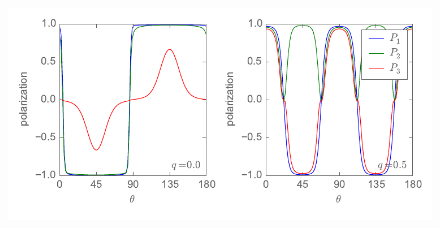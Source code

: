 %
\begin{figure}
  \center
  \includegraphics{three_cells_P_over_theta}
  \caption{
  }
  \label{fig:three_cells_P_over_theta}
\end{figure}
%
